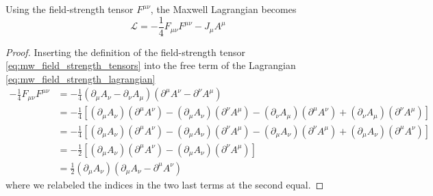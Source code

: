 \begin{lemma}
	Using the field-strength tensor $F^{\mu\nu}$, the Maxwell Lagrangian becomes
	\begin{equation}
		\mathcal{L}
		=
		-
		\frac{1}{4}
		F_{\mu\nu}
		F^{\mu\nu}
		-
		J_\mu A^\mu
		\label{eq:mw_field_strength_lagrangian}
	\end{equation}
\end{lemma}
\begin{proof}
	Inserting the definition of the field-strength tensor \cref{eq:mw_field_strength_tensors} into the free term of the Lagrangian \cref{eq:mw_field_strength_lagrangian}
	\begin{equation*}
		\begin{split}
			-
			\frac{1}{4}
			F_{\mu\nu}
			F^{\mu\nu}
			&=
			-
			\frac{1}{4}
			\left(
				\partial_\mu A_\nu
				-
				\partial_\nu A_\mu
			\right)
			\left(
				\partial^\mu A^\nu
				-
				\partial^\nu A^\mu
			\right)
			\\
			&=
			-
			\frac{1}{4}
			\left[
				(\partial_\mu A_\nu)
				(\partial^\mu A^\nu)
				-
				(\partial_\mu A_\nu)
				(\partial^\nu A^\mu)
				-
				(\partial_\nu A_\mu)
				(\partial^\mu A^\nu)
				+
				(\partial_\nu A_\mu)
				(\partial^\nu A^\mu)
			\right]
			\\
			&=
			-
			\frac{1}{4}
			\left[
				(\partial_\mu A_\nu)
				(\partial^\mu A^\nu)
				-
				(\partial_\mu A_\nu)
				(\partial^\nu A^\mu)
				-
				(\partial_\mu A_\nu)
				(\partial^\nu A^\mu)
				+
				(\partial_\mu A_\nu)
				(\partial^\mu A^\nu)
			\right]
			\\
			&=
			-
			\frac{1}{2}
			\left[
				(\partial_\mu A_\nu)
				(\partial^\mu A^\nu)
				-
				(\partial_\mu A_\nu)
				(\partial^\nu A^\mu)
			\right]
			\\
			&=
			\frac{1}{2}
			(\partial_\mu A_\nu)
			\left(
				\partial_\mu A_\nu
				-
				\partial^\mu A^\nu
			\right)
		\end{split}
	\end{equation*}
	where we relabeled the indices in the two last terms at the second equal.
\end{proof}

